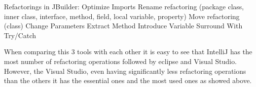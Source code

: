 Refactorings in JBuilder: 
Optimize Imports
Rename refactoring (package class, inner class, interface, method, field, local variable, property)
Move refactoring (class)
Change Parameters
Extract Method
Introduce Variable
Surround With Try/Catch

When comparing this 3 tools with each other it is easy to see that IntelliJ has the most number of refactoring operations followed by eclipse and Visual Studio. However, the Visual Studio, even having significantly less refactoring operations than the others it has the essential ones and the most used ones as showed above.


 